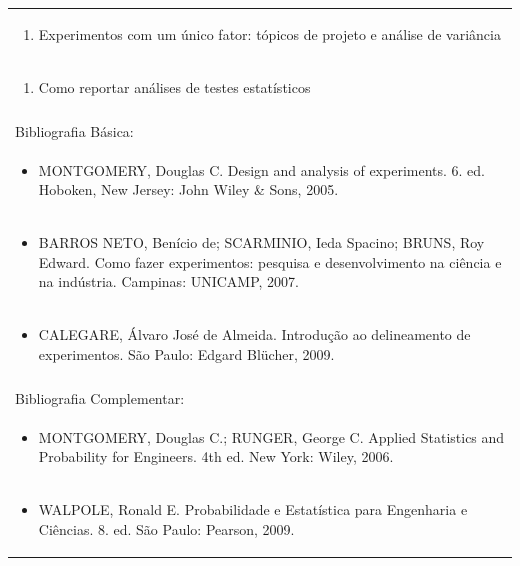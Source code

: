 \documentclass[11pt]{article}
\begin{document}
\begin{center}
\begin{longtable}{|p{4cm}|p{4cm}|p{4cm}|p{4cm}|}
\multicolumn{4}{|p{\dimexpr 16cm + 6\tabcolsep\relax}|}{\begin{enumerate}[start=19]\item Experimentos com um único fator: tópicos de projeto e análise de variância\end{enumerate}}\\
\multicolumn{4}{|p{\dimexpr 16cm + 6\tabcolsep\relax}|}{\begin{enumerate}[start=20]\item Como reportar análises de testes estatísticos\end{enumerate}}\\
\multicolumn{4}{|p{\dimexpr 16cm + 6\tabcolsep\relax}|}{}\\
\hline
\multicolumn{4}{|p{16cm}|}{Bibliografia Básica:}\\*
\multicolumn{4}{|p{\dimexpr 16cm + 6\tabcolsep\relax}|}{\begin{itemize}\item MONTGOMERY, Douglas C. Design and analysis of experiments. 6. ed. Hoboken, New Jersey: John Wiley \& Sons, 2005.\end{itemize}}\\
\multicolumn{4}{|p{\dimexpr 16cm + 6\tabcolsep\relax}|}{\begin{itemize}\item BARROS NETO, Benício de; SCARMINIO, Ieda Spacino; BRUNS, Roy Edward. Como fazer experimentos: pesquisa e desenvolvimento na ciência e na indústria. Campinas: UNICAMP, 2007.\end{itemize}}\\
\multicolumn{4}{|p{\dimexpr 16cm + 6\tabcolsep\relax}|}{\begin{itemize}\item CALEGARE, Álvaro José de Almeida. Introdução ao delineamento de experimentos. São Paulo: Edgard Blücher, 2009.\end{itemize}}\\
\multicolumn{4}{|p{16cm}|}{}\\
\hline
\multicolumn{4}{|p{16cm}|}{Bibliografia Complementar:}\\*
\multicolumn{4}{|p{\dimexpr 16cm + 6\tabcolsep\relax}|}{\begin{itemize}\item MONTGOMERY, Douglas C.; RUNGER, George C. Applied Statistics and Probability for Engineers. 4th ed. New York: Wiley, 2006.\end{itemize}}\\
\multicolumn{4}{|p{\dimexpr 16cm + 6\tabcolsep\relax}|}{\begin{itemize}\item WALPOLE, Ronald E. Probabilidade e Estatística para Engenharia e Ciências. 8. ed. São Paulo: Pearson, 2009.\end{itemize}}\\

\end{longtable}
\end{center}
\end{document}
